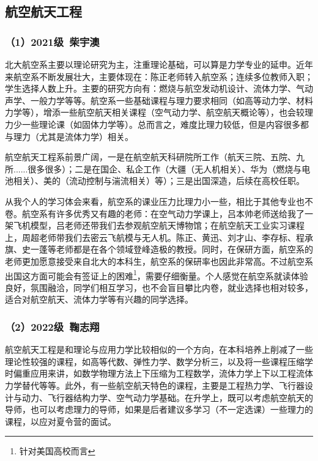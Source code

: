 \subsection{航空航天工程}
\subsubsection{（1）2021级\ 柴宇澳}

北大航空系主要以理论研究为主，注重理论基础，可以算是力学专业的延申。近年来航空系不断发展壮大，主要体现在：陈正老师转入航空系；连续多位教师入职；学生选择人数上升。主要的研究方向有：燃烧与航空发动机设计、流体力学、气动声学、一般力学等等。航空系一些基础课程与理力要求相同（如高等动力学、材料力学等），增添一些航空航天相关课程（空气动力学、航空航天概论等），也会较理力少一些理论课（如固体力学等）。总而言之，难度比理力较低，但是内容很多都与理力（尤其是流体力学）相关。

\vspace{10pt}

航空航天工程系前景广阔，一是在航空航天科研院所工作（航天三院、五院、九所......很多很多）；二是在国企、私企工作（大疆（无人机相关）、华为（燃烧与电池相关）、美的（流动控制与湍流相关）等）；三是出国深造，后续在高校任职。

\vspace{10pt}

从我个人的学习体会来看，航空系的课业压力比理力小一些，相比于其他专业也不卷。航空系有许多优秀又有趣的老师：在空气动力学课上，吕本帅老师送给我了一架飞机模型，吕老师还带我们去参观航空航天博物馆；在航空航天工业实习课程上，周超老师带我们去密云飞航模与无人机。陈正、黄迅、刘才山、李存标、程承旗、史一蓬等老师都是在各个领域登峰造极的教授。同时，在保研方面，航空系的老师更加愿意接受来自北大的本科生，航空系的保研率也因此非常高。不过航空系出国这方面可能会有签证上的困难\footnote{针对美国高校而言}，需要仔细衡量。个人感觉在航空系就读体验良好，氛围融洽，同学们相互学习，也不会盲目攀比内卷，就业选择也相对较多，适合对航空航天、流体力学等有兴趣的同学选择。

\subsubsection{（2）2022级\ 鞠志翔}

航空航天工程是和理论与应用力学比较相似的一个方向，在本科培养上削减了一些理论性较强的课程，如高等代数、弹性力学、数学分析三，以及将一些课程压缩学时偏重应用来讲，如数学物理方法上下压缩为工程数学，流体力学上下以工程流体力学替代等等。此外，有一些航空航天特色的课程，主要是工程热力学、飞行器设计与动力、飞行器结构力学、空气动力学基础。在升学上，既可以考虑航空航天的导师，也可以考虑理力的导师，如果是后者建议多学习（不一定选课）一些理力的课程，以应对夏令营的面试。

